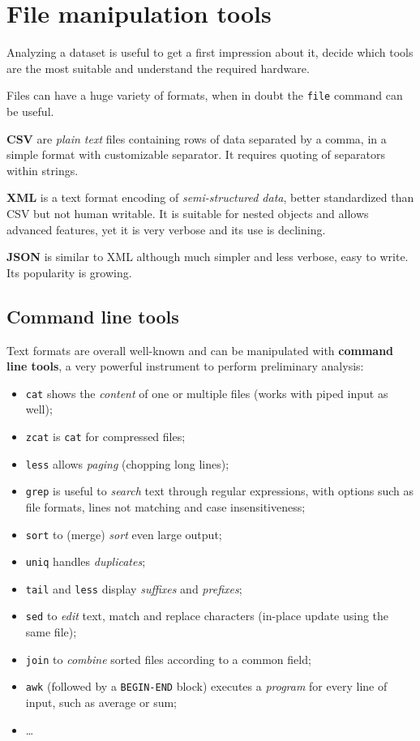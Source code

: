 
\section{File manipulation tools}
Analyzing a dataset is useful to get a first impression about it, decide which tools are the most suitable and understand the required hardware.

Files can have a huge variety of formats, when in doubt the \texttt{file} command can be useful.

\textbf{CSV} are \textit{plain text} files containing rows of data separated by a comma, in a simple format with customizable separator. It requires quoting of separators within strings.

\textbf{XML} is a text format encoding of \textit{semi-structured data}, better standardized than CSV but not human writable. It is suitable for nested objects and allows advanced features, yet it is very verbose and its use is declining.

\textbf{JSON} is similar to XML although much simpler and less verbose, easy to write. Its popularity is growing. 

\subsection{Command line tools}
Text formats are overall well-known and can be manipulated with \textbf{command line tools}, a very powerful instrument to perform preliminary analysis:
\begin{itemize}
	\item \texttt{cat} shows the \textit{content} of one or multiple files (works with piped input as well);
	\item \texttt{zcat} is \texttt{cat} for compressed files;
	\item \texttt{less} allows \textit{paging} (chopping long lines);
	\item \texttt{grep} is useful to \textit{search} text through regular expressions, with options such as file formats, lines not matching and case insensitiveness;
	\item \texttt{sort} to (merge) \textit{sort} even large output;
	\item \texttt{uniq} handles \textit{duplicates};
	\item \texttt{tail} and \texttt{less} display \textit{suffixes} and \textit{prefixes};
	\item \texttt{sed} to \textit{edit} text, match and replace characters (in-place update using the same file);
	\item \texttt{join} to \textit{combine} sorted files according to a common field;
	\item \texttt{awk} (followed by a \texttt{BEGIN-END} block) executes a \textit{program} for every line of input, such as average or sum;
	\item \dots
\end{itemize}

